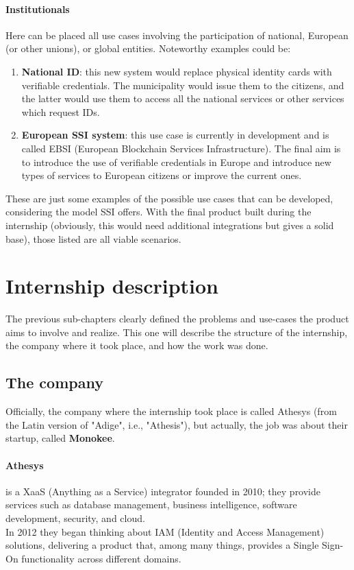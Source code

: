 \paragraph{Institutionals}
Here can be placed all use cases involving the participation of national, 
European (or other unions), or global entities.
Noteworthy examples could be:
\begin{enumerate}
    \item \textbf{National ID}: this new system would replace physical identity 
    cards with verifiable credentials. The municipality would issue them to the 
    citizens, and the latter would use them to access all the national services 
    or other services which request IDs.
    \item \textbf{European SSI system}: this use case is currently in development 
    and is called EBSI (European Blockchain Services Infrastructure). The final 
    aim is to introduce the use of verifiable credentials in Europe and introduce 
    new types of services to European citizens or improve the current ones.
\end{enumerate}
\vspace*{0.3cm}
These are just some examples of the possible use cases that can be developed, 
considering the model SSI offers.
With the final product built during the internship (obviously, this would need 
additional integrations but gives a solid base), those listed are all viable 
scenarios.
\section{Internship description}
The previous sub-chapters clearly defined the problems and use-cases the product 
aims to involve and realize. This one will describe the structure of the internship, 
the company where it took place, and how the work was done.
\subsection{The company}
Officially, the company where the internship took place is 
called Athesys (from the Latin version of "Adige", i.e., "Athesis"), but actually, 
the job was about their startup, called \textbf{Monokee}.
    \paragraph{Athesys} is a XaaS (Anything as a Service) integrator founded 
    in 2010; they provide     services such as database management, business 
    intelligence, software development, security, and cloud.\\
    In 2012 they began thinking about IAM (Identity and Access Management) solutions, 
    delivering a product that, among many things, provides a Single Sign-On 
    functionality across different domains.
